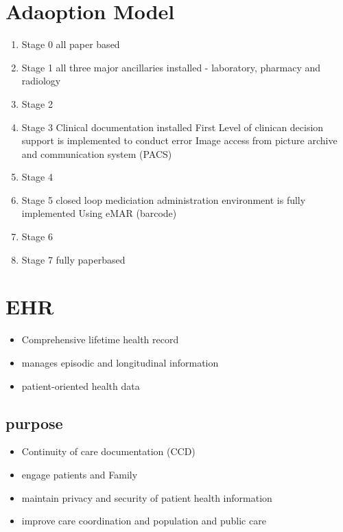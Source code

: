 \documentclass{report}
\theoremstyle{definition}
\theoremstyle{example}
\begin{document}
\section{Adaoption Model}
\begin{enumerate}
   \item Stage 0
   \subitem all paper based 
   \item Stage 1
   \subitem all three major ancillaries installed - laboratory, pharmacy and radiology 
   \item Stage 2
   \subitem 
   \item Stage 3
   \subitem Clinical documentation installed
   \subitem First Level of clinican decision support is implemented to conduct error
   \subitem Image access from picture archive and communication system (PACS)
   \item Stage 4
   \item Stage 5
   \subitem closed loop mediciation administration environment is fully implemented
   \subitem Using eMAR (barcode) 
   \item Stage 6  
   \item Stage 7
   \subitem fully paperbased   
\end{enumerate}

\section{EHR}
\begin{itemize}
   \item Comprehensive lifetime health record
   \item manages episodic and longitudinal information
   \item patient-oriented health data
\end{itemize}
\subsection{purpose}
\begin{itemize}
   \item Continuity of care documentation (CCD)
   \item engage patients and Family
   \item maintain privacy and security of patient health information
   \item improve care coordination and population and public care
\end{itemize}
\end{document}
